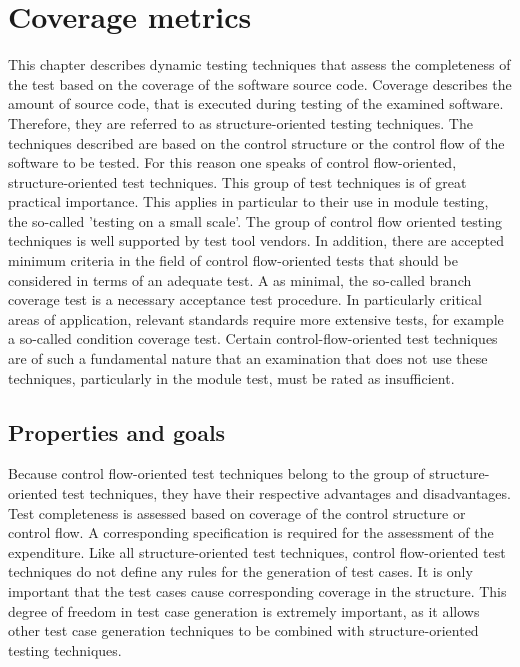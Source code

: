 	

	
	\section{Coverage metrics}
	
	This chapter describes dynamic testing techniques that assess the completeness of the test based on the coverage of the software source code. Coverage describes the amount of source code, that is executed during testing of the examined software. Therefore, they are referred to as structure-oriented testing techniques. The techniques described are based on the control structure or the control flow of the software to be tested. For this reason one speaks of control flow-oriented, structure-oriented test techniques. This group of test techniques is of great practical importance. This applies in particular to their use in module testing, the so-called 'testing on a small scale'. The group of control flow oriented testing techniques is well supported by test tool vendors. In addition, there are accepted minimum criteria in the field of control flow-oriented tests that should be considered in terms of an adequate test. A as minimal, the so-called branch coverage test is a necessary acceptance test procedure. In particularly critical areas of application, relevant standards require more extensive tests, for example a so-called condition coverage test. Certain control-flow-oriented test techniques are of such a fundamental nature that an examination that does not use these techniques, particularly in the module test, must be rated as insufficient.	
	

	\subsection{Properties and goals }

	Because control flow-oriented test techniques belong to the group of structure-oriented test techniques, they have their respective advantages and disadvantages. Test completeness is assessed based on coverage of the control structure or control flow. A corresponding specification is required for the assessment of the expenditure. Like all structure-oriented test techniques, control flow-oriented test techniques do not define any rules for the generation of test cases. It is only important that the test cases cause corresponding coverage in the structure. This degree of freedom in test case generation is extremely important, as it allows other test case generation techniques to be combined with structure-oriented testing techniques.

